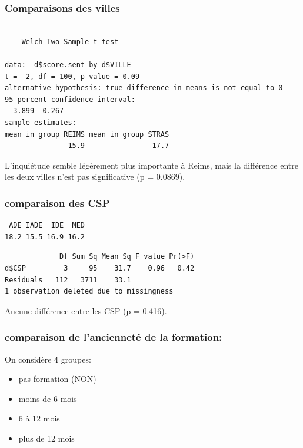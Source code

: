 \documentclass[]{article}
\begin{document}
\subsubsection{Comparaisons des villes}\label{comparaisons-des-villes-1}

\begin{verbatim}

    Welch Two Sample t-test

data:  d$score.sent by d$VILLE
t = -2, df = 100, p-value = 0.09
alternative hypothesis: true difference in means is not equal to 0
95 percent confidence interval:
 -3.899  0.267
sample estimates:
mean in group REIMS mean in group STRAS 
               15.9                17.7 
\end{verbatim}

L'inquiétude semble légèrement plus importante à Reims, mais la
différence entre les deux villes n'est pas significative (p = 0.0869).

\subsubsection{comparaison des CSP}\label{comparaison-des-csp-2}

\begin{verbatim}
 ADE IADE  IDE  MED 
18.2 15.5 16.9 16.2 
\end{verbatim}

\begin{verbatim}
             Df Sum Sq Mean Sq F value Pr(>F)
d$CSP         3     95    31.7    0.96   0.42
Residuals   112   3711    33.1               
1 observation deleted due to missingness
\end{verbatim}

Aucune différence entre les CSP (p = 0.416).

\subsubsection{comparaison de l'ancienneté de la
formation:}\label{comparaison-de-lanciennete-de-la-formation-1}

On considère 4 groupes:

\begin{itemize}
\itemsep1pt\parskip0pt
\item
  pas formation (NON)
\item
  moins de 6 mois
\item
  6 à 12 mois
\item
  plus de 12 mois
\end{itemize}
\end{document}
